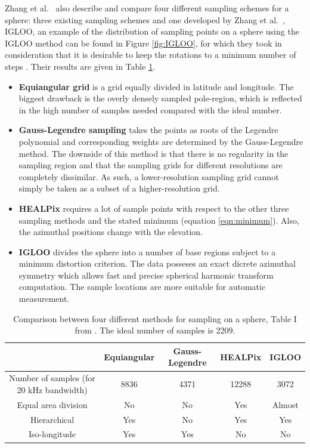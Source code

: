 Zhang et al.\ \cite{Zhang2012575} also describe and compare four different sampling schemes for a sphere: three existing sampling schemes and one developed by Zhang et al.\ \cite{Zhang2012575}, IGLOO, an example of the distribution of sampling points on a sphere using the IGLOO method can be found in Figure \ref{fig:IGLOO}, for which they took in consideration that it is desirable to keep the rotations to a minimum number of steps \cite{Zhang2012575}. Their results are given in Table \ref{tab:IGLOO}.

\begin{itemize}
\item[]	\textbf{Equiangular grid} is a grid equally divided in latitude and longitude. The biggest drawback is the overly densely sampled pole-region, which is reflected in the high number of samples needed compared with the ideal number.
\item[]	\textbf{Gauss-Legendre sampling} takes the points as roots of the Legendre polynomial and corresponding weights are determined by the Gauss-Legendre method. The downside of this method is that there is no regularity in the sampling region and that the sampling grids for different resolutions are completely dissimilar. As such, a lower-resolution sampling grid cannot simply be taken as a subset of a higher-resolution grid.
\item[]	\textbf{HEALPix} requires a lot of sample points with respect to the other three sampling methods and the stated minimum (equation \ref{eqn:minimum}). Also, the azimuthal positions change with the elevation.
\item[]	\textbf{IGLOO} divides the sphere into a number of base regions subject to a minimum distortion criterion. The data posseses an exact dicrete azimuthal symmetry which allows fast and precise spherical harmonic transform computation. The sample locations are more suitable for automatic measurement.
\end{itemize}

\begin{table}[t!]
\centering
\begin{tabular}{ccccc}
\hline
\hline
&Equiangular&Gauss-Legendre&HEALPix&IGLOO\\
\hline
Number of samples (for 20 kHz bandwidth)&8836&4371&12288&3072\\
Equal area division&No&No&Yes&Almost\\
Hierarchical&Yes&No&Yes&Yes\\
Iso-longitude&Yes&Yes&No&No\\
\hline
\hline
\end{tabular}
\caption{Comparison between four different methods for sampling on a sphere, Table I from \cite{Zhang2012575}. The ideal number of samples is 2209.}
\label{tab:IGLOO}
\end{table}